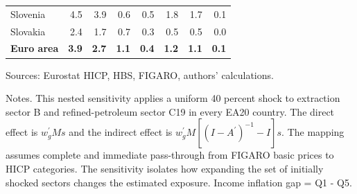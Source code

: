 \documentclass[11pt]{article}
\begin{document}
\begin{table}[H]
\begin{tabular}{lrrrrrrr}
 \\
Slovenia & 4.5 & 3.9 & 0.6 & 0.5 & 1.8 & 1.7 & 0.1
 \\
Slovakia & 2.4 & 1.7 & 0.7 & 0.3 & 0.5 & 0.5 & 0.0
 \\
\midrule
\textbf{Euro area} & \textbf{3.9} & \textbf{2.7} & \textbf{1.1} & \textbf{0.4} & \textbf{1.2} & \textbf{1.1} & \textbf{0.1}
 \\
\bottomrule
\end{tabular}
\par\vspace{0.35em}\footnotesize\noindent Sources: Eurostat HICP, HBS, FIGARO, authors' calculations.
\par\vspace{0.25em}\footnotesize\noindent Notes. This nested sensitivity applies a uniform 40 percent shock to extraction sector B and refined-petroleum sector C19 in every EA20 country. The direct effect is $w_g^{\prime}Ms$ and the indirect effect is $w_g^{\prime}M[(I-A^{\prime})^{-1}-I]s$. The mapping assumes complete and immediate pass-through from FIGARO basic prices to HICP categories. The sensitivity isolates how expanding the set of initially shocked sectors changes the estimated exposure. Income inflation gap = Q1 - Q5.
\end{table}
\vspace{0.6em}
\end{document}
